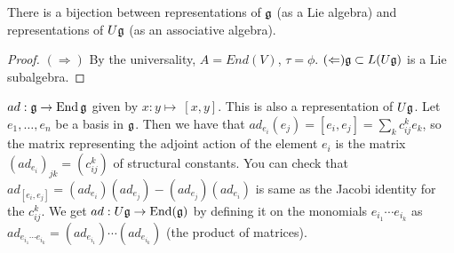  \begin{corollary} There is a bijection between representations of $\mathfrak{g}$ (as a Lie
    algebra) and representations of $U\mathfrak{g}$ (as an associative algebra).
 \end{corollary}
 \begin{proof} $(\Rightarrow)$ By the universality, $A=End(V)$, $\tau=\phi$.
$(\Leftarrow) \mathfrak{g}\subset L(U\mathfrak{g})$ is a Lie subalgebra.
 \end{proof}
 \begin{example}\label{lec07eg:adjoint}
  $ad:\mathfrak{g}\to \operatorname{End} \mathfrak{g}$ given by $x:y\mapsto~[x,y]$. This is also a representation of
  $U\mathfrak{g}$. Let $e_1,\dots, e_n$ be a basis in $\mathfrak{g}$. Then we have that $ad_{e_i}(e_j) =
  [e_i,e_j] = \sum_k c^k_{ij} e_k$, so the matrix representing the adjoint action of
  the element $e_i$ is the matrix $(ad_{e_i})_{jk}=(c^k_{ij})$ of structural
  constants. You can check that $ad_{[e_i,e_j]} = (ad_{e_i})(ad_{e_j})
  -(ad_{e_j})(ad_{e_i})$ is same as the Jacobi identity for the $c^k_{ij}$. We get
  $ad:U\mathfrak{g}\to \operatorname{End}(\mathfrak{g})$ by defining it on the monomials $e_{i_1}\cdots e_{i_k}$ as
  $ad_{e_{i_1}\cdots e_{i_k}}= (ad_{e_{i_1}})\cdots (ad_{e_{i_k}})$ (the product of
  matrices).
 \end{example}

